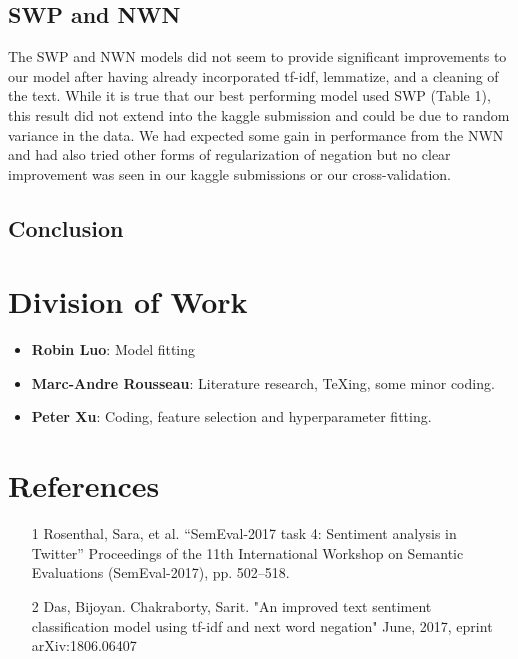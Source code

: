 \documentclass{amsart}
\theoremstyle{definition}
\theoremstyle{remark}
\numberwithin{equation}{section}
\begin{document}
\subsection{SWP and NWN}
The SWP and NWN models did not seem to provide significant improvements to our model after having already incorporated tf-idf, lemmatize, and a cleaning of the text.  While it is true that our best performing model used SWP (Table 1), this result did not extend into the kaggle submission and could be due to random variance in the data.  We had expected some gain in performance from the NWN and had also tried other forms of regularization of negation but no clear improvement was seen in our kaggle submissions or our cross-validation.  
\subsection{Conclusion}

\section{Division of Work}
\begin{itemize}
\item{\textbf{Robin Luo}}: Model fitting 
\item{\textbf{Marc-Andre Rousseau}}: Literature research, TeXing, some minor coding.
\item{\textbf{Peter Xu}}: Coding, feature selection and hyperparameter fitting.
\end{itemize}
\section{References}
\begin{itemize}
	\item [1] Rosenthal, Sara, et al. “SemEval-2017 task 4: Sentiment analysis in Twitter” Proceedings of the 11th International Workshop on Semantic Evaluations (SemEval-2017), pp. 502–518.
	\item [2] Das, Bijoyan. Chakraborty, Sarit. "An improved text sentiment classification model using tf-idf and next word negation" June, 2017, eprint arXiv:1806.06407
\end{itemize}
\end{document}
